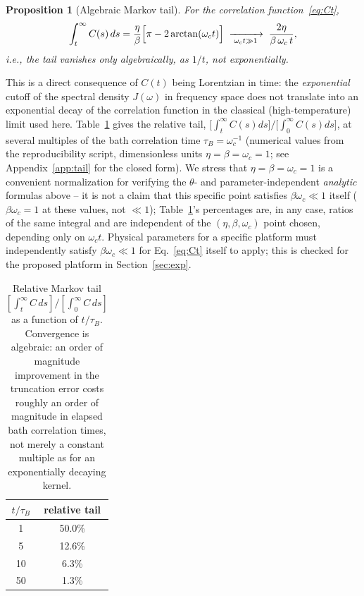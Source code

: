 \documentclass[aps,pra,reprint,superscriptaddress,nofootinbib,longbibliography]{revtex4-2}
\newtheorem{proposition}[theorem]{Proposition}
\begin{document}
\begin{proposition}[Algebraic Markov tail]
\label{prop:tail}
For the correlation function~\eqref{eq:Ct},
\begin{equation}
\int_t^\infty C(s)\,ds = \frac{\eta}{\beta}\Bigl[\pi-2\arctan(\omega_c t)\Bigr]
\;\xrightarrow[\;\omega_c t\gg1\;]{}\; \frac{2\eta}{\beta\,\omega_c\,t},
\label{eq:tail}
\end{equation}
i.e., the tail vanishes only \emph{algebraically}, as $1/t$, not
exponentially.
\end{proposition}
This is a direct consequence of $C(t)$ being Lorentzian in time: the
\emph{exponential} cutoff of the spectral density $J(\omega)$ in
frequency space does not translate into an exponential decay of the
correlation function in the classical (high-temperature) limit used
here. Table~\ref{tab:tail} gives the relative tail,
$\bigl[\int_t^\infty C(s)ds\bigr]/\bigl[\int_0^\infty C(s)ds\bigr]$,
at several multiples of the bath correlation time $\tau_B=\omega_c^{-1}$
(numerical values from the reproducibility script, dimensionless units
$\eta=\beta=\omega_c=1$; see Appendix~\ref{app:tail} for the closed
form). We stress that $\eta=\beta=\omega_c=1$ is a convenient
normalization for verifying the $\theta$- and parameter-independent
\emph{analytic} formulas above -- it is not a claim that this specific
point satisfies $\beta\omega_c\ll1$ itself ($\beta\omega_c=1$ at these
values, not $\ll1$); Table~\ref{tab:tail}'s percentages are, in any
case, ratios of the same integral and are independent of the
$(\eta,\beta,\omega_c)$ point chosen, depending only on $\omega_c t$.
Physical parameters for a specific platform must independently satisfy
$\beta\omega_c\ll1$ for Eq.~\eqref{eq:Ct} itself to apply; this is
checked for the proposed platform in Section~\ref{sec:exp}.

\begin{table}[htbp]
\centering
\caption{Relative Markov tail $[\int_t^\infty C\,ds]/[\int_0^\infty C\,ds]$
as a function of $t/\tau_B$. Convergence is algebraic: an order of
magnitude improvement in the truncation error costs roughly an order
of magnitude in elapsed bath correlation times, not merely a constant
multiple as for an exponentially decaying kernel.}
\label{tab:tail}
\begin{tabular}{cc}
\hline\hline
$t/\tau_B$ & relative tail \\
\hline
1  & 50.0\% \\
5  & 12.6\% \\
10 & 6.3\%  \\
50 & 1.3\%  \\
\hline\hline
\end{tabular}
\end{table}
\end{document}
